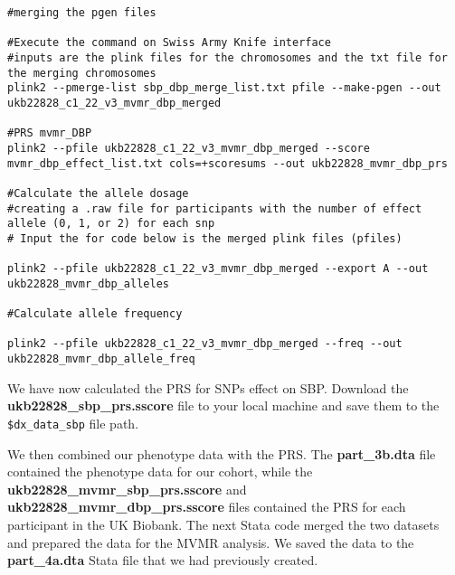 \documentclass[11pt]{article}
\newcounter{subsubsubsection}[subsubsection]
\begin{document}
\begin{lstlisting}[style=BashStyle]
#merging the pgen files

#Execute the command on Swiss Army Knife interface 
#inputs are the plink files for the chromosomes and the txt file for the merging chromosomes 
plink2 --pmerge-list sbp_dbp_merge_list.txt pfile --make-pgen --out ukb22828_c1_22_v3_mvmr_dbp_merged

#PRS mvmr_DBP
plink2 --pfile ukb22828_c1_22_v3_mvmr_dbp_merged --score mvmr_dbp_effect_list.txt cols=+scoresums --out ukb22828_mvmr_dbp_prs

#Calculate the allele dosage 
#creating a .raw file for participants with the number of effect allele (0, 1, or 2) for each snp
# Input the for code below is the merged plink files (pfiles)

plink2 --pfile ukb22828_c1_22_v3_mvmr_dbp_merged --export A --out ukb22828_mvmr_dbp_alleles

#Calculate allele frequency 

plink2 --pfile ukb22828_c1_22_v3_mvmr_dbp_merged --freq --out ukb22828_mvmr_dbp_allele_freq

\end{lstlisting}

We have now calculated the PRS for SNPs effect on SBP. Download the \textbf{ukb22828\_sbp\_prs.sscore} file to your local machine and save them to the \texttt{\$dx\_data\_sbp} file path.


We then combined our phenotype data with the PRS. The \textbf{part\_3b.dta} file contained the phenotype data for our cohort, while the \textbf{ukb22828\_mvmr\_sbp\_prs.sscore} and \textbf{ukb22828\_mvmr\_dbp\_prs.sscore} files contained the PRS for each participant in the UK Biobank. The next Stata code merged the two datasets and prepared the data for the MVMR analysis. We saved the data to the \textbf{part\_4a.dta} Stata file that we had previously created.

\color{violet}
\begin{stlog}\end{stlog}
\color{black}
\end{document}
